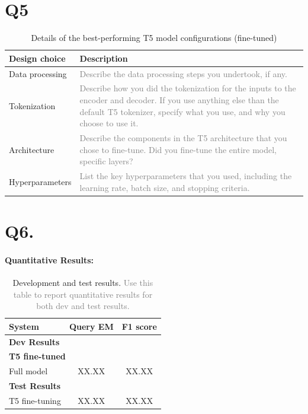 \documentclass{article}
\begin{document}
\section*{Q5}\label{sec:t5}


\begin{table}[h!]
\centering
\begin{tabular}{p{3.5cm}p{10cm}}
\toprule
Design choice & Description \\
\midrule
Data processing & \textcolor{gray}{Describe the data processing steps you undertook, if any.} \\
Tokenization & \textcolor{gray}{Describe how you did the tokenization for the inputs to the encoder and decoder. If you use anything else than the default T5 tokenizer, specify what you use, and why you choose to use it.} \\
Architecture & \textcolor{gray}{Describe the components in the T5 architecture that you chose to fine-tune. Did you fine-tune the entire model, specific layers?} \\
Hyperparameters & \textcolor{gray}{List the key hyperparameters that you used, including the learning rate, batch size, and stopping criteria.} \\
\bottomrule
\end{tabular}
\caption{Details of the best-performing T5 model configurations (fine-tuned)}
\label{tab:t5_results_ft}
\end{table}







\section*{Q6. }

\paragraph{Quantitative Results:} 
\begin{table}[h!]
\centering
\begin{tabular}{lcc}
  \toprule
  System & Query EM & F1 score\\
  \midrule
  \multicolumn{3}{l}{\textbf{Dev Results}} \\
  \midrule
  
  \multicolumn{3}{l}{\textbf{T5 fine-tuned}} \\
  Full model & XX.XX & XX.XX \\[5pt]
  
  \midrule
  \multicolumn{3}{l}{\textbf{Test Results}} \\
  \midrule
  T5 fine-tuning & XX.XX & XX.XX \\
  \bottomrule
\end{tabular}  
\caption{Development and test results. \textcolor{gray}{Use this table to report quantitative results for both dev and test results.}}
\label{tab:results}
\end{table}
\end{document}
